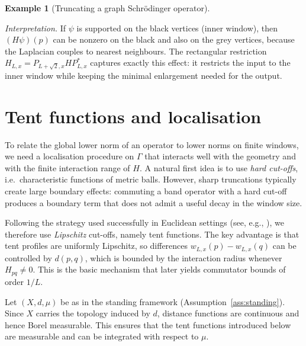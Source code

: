 \documentclass[11pt]{article}
\theoremstyle{definition}
\newtheorem{example}[theorem]{Example}
\begin{document}
\begin{example}[Truncating a graph Schr\"odinger operator]
\begin{center}
\end{center}

\noindent
\emph{Interpretation.}
If $\psi$ is supported on the black vertices (inner window), then $(H\psi)(p)$
can be nonzero on the black and also on the grey vertices, because the Laplacian couples to
nearest neighbours. The rectangular restriction $H_{L,x}=P_{L+\sqrt{2},x}HP_{L,x}^*$
captures exactly this effect: it restricts the input to the inner window while
keeping the minimal enlargement needed for the output.
\end{example}

\section{Tent functions and localisation}
\label{sec:tent}

To relate the global lower norm of an operator to lower norms on finite windows,
we need a localisation procedure on $\Gamma$ that interacts well with the
geometry and with the finite interaction range of $H$. A natural first idea is
to use \emph{hard cut-offs}, i.e.\ characteristic functions of metric balls.
However, sharp truncations typically create large boundary effects: commuting a
band operator with a hard cut-off produces a boundary term that does not admit a
useful decay in the window size.

Following the strategy used successfully in Euclidean settings (see, e.g.,
\cite{HegeMoscolariTeufel2026}), we therefore use \emph{Lipschitz} cut-offs, namely
tent functions. The key advantage is that tent profiles are uniformly Lipschitz,
so differences $w_{L,x}(p)-w_{L,x}(q)$ can be controlled by $d(p,q)$, which is
bounded by the interaction radius whenever $H_{pq}\neq 0$. This is the basic
mechanism that later yields commutator bounds of order $1/L$.

\medskip

Let $(X,d,\mu)$ be as in the standing framework (Assumption~\ref{ass:standing}).
Since \(X\) carries the topology induced by \(d\), distance functions are continuous and hence Borel measurable. This ensures that the tent functions
introduced below are measurable and can be integrated with respect to $\mu$.
\end{document}
